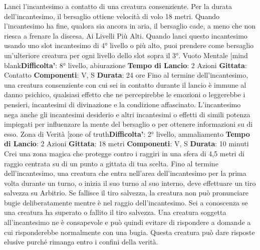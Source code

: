 \begin{multicols}{2}
Lanci l’incantesimo a contatto di una creatura
consenziente. Per la durata dell’incantesimo, il
bersaglio ottiene velocità di volo 18 metri. Quando
l’incantesimo ha fine, qualora sia ancora in aria, il
bersaglio cade, a meno che non riesca a frenare la
discesa.
Ai Livelli Più Alti. Quando lanci questo incantesimo
usando uno slot incantesimo di 4° livello o più alto, puoi
prendere come bersaglio un’ulteriore creatura per ogni
livello dello slot sopra il 3°.
Vuoto Mentale
[mind blank\textbf{Difficolta'}:
8° livello, abiurazione
\textbf{Tempo di Lancio}: 2 Azioni
\textbf{Gittata}: Contatto
\textbf{Componenti}: V, S
\textbf{Durata}: 24 ore
Fino al termine dell’incantesimo, una creatura
consenziente con cui sei in contatto durante il lancio è
immune al danno psichico, qualsiasi effetto che ne
percepirebbe le emozioni o leggerebbe i pensieri,
incantesimi di divinazione e la condizione affascinato.
L’incantesimo nega anche gli incantesimi desiderio e
altri incantesimi o effetti di simili potenza impiegati per
influenzare la mente del bersaglio o per ottenere
informazioni su di esso.
Zona di Verità
[zone of truth\textbf{Difficolta'}:
2° livello, ammaliamento
\textbf{Tempo di Lancio}: 2 Azioni
\textbf{Gittata}: 18 metri
\textbf{Componenti}: V, S
\textbf{Durata}: 10 minuti
Crei una zona magica che protegge contro i raggiri in
una sfera di 4,5 metri di raggio centrata su di un punto a
gittata di tua scelta. Fino al termine dell’incantesimo,
una creatura che entra nell’area dell’incantesimo per la
prima volta durante un turno, o inizia il suo turno al suo
interno, deve effettuare un tiro salvezza su Arbitrio. Se
fallisce il tiro salvezza, la creatura non può pronunciare
bugie deliberatamente mentre è nel raggio
dell’incantesimo. Sei a conoscenza se una creatura ha
superato o fallito il tiro salvezza.
Una creatura soggetta all’incantesimo ne è
consapevole e può quindi evitare di rispondere a
domande a cui risponderebbe normalmente con una
bugia. Questa creatura può dare risposte elusive
purché rimanga entro i confini della verità.

\end{multicols}